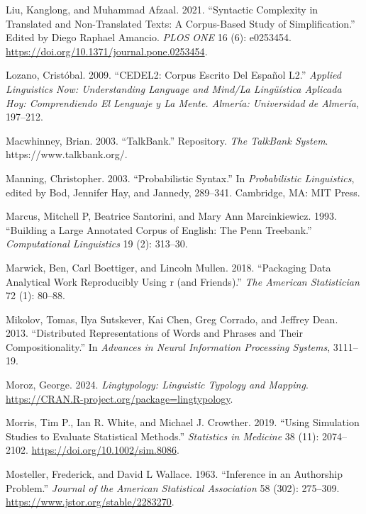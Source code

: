 \documentclass[
  letterpaper,
  DIV=11,
  numbers=noendperiod]{scrreprt}
\newlength{\cslhangindent}
\newenvironment{CSLReferences}[2] %
 {\begin{list}{}{%
  \setlength{\itemindent}{0pt}
  \setlength{\leftmargin}{0pt}
  \setlength{\parsep}{0pt}
  \ifodd #1
   \setlength{\leftmargin}{\cslhangindent}
   \setlength{\itemindent}{-1\cslhangindent}
  \fi
  \setlength{\itemsep}{#2\baselineskip}}}
 {\end{list}}
\theoremstyle{definition}
\theoremstyle{remark}
\begin{document}
\begin{CSLReferences}{1}{0}
Liu, Kanglong, and Muhammad Afzaal. 2021. {``Syntactic Complexity in
Translated and Non-Translated Texts: A Corpus-Based Study of
Simplification.''} Edited by Diego Raphael Amancio. \emph{PLOS ONE} 16
(6): e0253454. \url{https://doi.org/10.1371/journal.pone.0253454}.

Lozano, Cristóbal. 2009. {``CEDEL2: Corpus Escrito Del Espa{ñ}ol L2.''}
\emph{Applied Linguistics Now: Understanding Language and Mind/La
Ling{ü}{í}stica Aplicada Hoy: Comprendiendo El Lenguaje y La Mente.
Almer{í}a: Universidad de Almer{í}a}, 197--212.

Macwhinney, Brian. 2003. {``TalkBank.''} Repository. \emph{The TalkBank
System}. https://www.talkbank.org/.

Manning, Christopher. 2003. {``Probabilistic Syntax.''} In
\emph{Probabilistic Linguistics}, edited by Bod, Jennifer Hay, and
Jannedy, 289--341. Cambridge, MA: MIT Press.

Marcus, Mitchell P, Beatrice Santorini, and Mary Ann Marcinkiewicz.
1993. {``Building a Large Annotated Corpus of English: The Penn
Treebank.''} \emph{Computational Linguistics} 19 (2): 313--30.

Marwick, Ben, Carl Boettiger, and Lincoln Mullen. 2018. {``Packaging
Data Analytical Work Reproducibly Using r (and Friends).''} \emph{The
American Statistician} 72 (1): 80--88.

Mikolov, Tomas, Ilya Sutskever, Kai Chen, Greg Corrado, and Jeffrey
Dean. 2013. {``Distributed Representations of Words and Phrases and
Their Compositionality.''} In \emph{Advances in Neural Information
Processing Systems}, 3111--19.

Moroz, George. 2024. \emph{Lingtypology: Linguistic Typology and
Mapping}. \url{https://CRAN.R-project.org/package=lingtypology}.

Morris, Tim P., Ian R. White, and Michael J. Crowther. 2019. {``Using
Simulation Studies to Evaluate Statistical Methods.''} \emph{Statistics
in Medicine} 38 (11): 2074--2102.
\url{https://doi.org/10.1002/sim.8086}.

Mosteller, Frederick, and David L Wallace. 1963. {``Inference in an
Authorship Problem.''} \emph{Journal of the American Statistical
Association} 58 (302): 275--309.
\url{https://www.jstor.org/stable/2283270}.


\end{CSLReferences}
\end{document}
